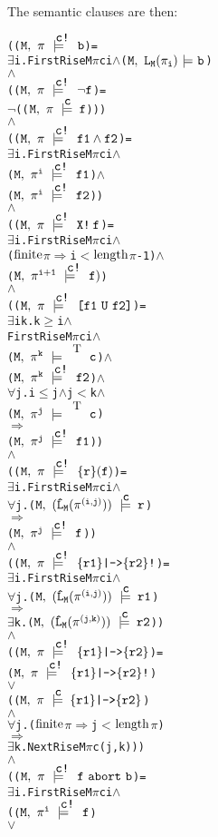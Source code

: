 \documentclass{llncs}
\newcommand{\And}{\(\wedge\)}
\newcommand{\Or}{\(\vee\)}
\newcommand{\Imp}{\(\Rightarrow\)}
\newcommand{\Not}{\(\neg\)}
\newcommand{\Forall}{\(\forall\)}
\newcommand{\Exists}{\(\exists\)}
\newcommand{\IsFinitePath}{\({\rm{finite}}\)}
\newcommand{\PathLength}{\({\rm{length}}\)}
\newcommand{\Leq}{\(\leq\)}
\newcommand{\Geq}{\(\geq\)}
\newcommand{\Le}{\(<\)}
\newcommand{\T}{\texttt{\small\rm{T}}}
\renewcommand{\Pi}{\(\pi\)}
\newcommand{\BSem}[3]{(\(\tt#1,~#2~{\models}~#3\))}
\newcommand{\SSem}[4]{(\(\tt{#1,~#2~\models^{\hspace*{-2.3mm}\raisebox{1mm}{\tt#3}}~#4}\))}
\newcommand{\FSem}[4]{(\(\tt{#1,~#2~\models^{\hspace*{-2.3mm}\raisebox{1mm}{\tt#3}}~#4}\))}
\newcommand{\FBool}[1]{#1}
\newcommand{\fNot}[1]{\neg#1}
\newcommand{\weakClock}[1]{#1}
\newcommand{\strongClock}[1]{#1!}
\newcommand{\restN}[2]{#1^{#2}}
\newcommand{\pathEl}[2]{#1_{#2}}
\newcommand{\pathSeg}[2]{#1^{#2}}
\newcommand{\lHat}[1]{\hat{\texttt{L}}_{#1}}
\newcommand{\lNoHat}[1]{{\texttt{L}}_{#1}}
\newcommand{\fAnd}[2]{#1 \wedge #2}
\newcommand{\fNext}[1]{\texttt{X!}\hspace*{0.8mm}#1}
\newcommand{\fUntil}[2]{\texttt{[}#1~\texttt{U}~#2\texttt{]}}
\newcommand{\fSuffixImp}[2]{\{#1\}(#2)}
\newcommand{\fStrongImp}[2]{\{#1\}\texttt{|->}\{#2\}\texttt{!}}
\newcommand{\fWeakImp}[2]{\{#1\}\texttt{|->}\{#2\}}
\newcommand{\fAbort}[2]{#1~\texttt{abort}~#2}
\begin{document}
The semantic clauses are then:

\begin{alltt}
    ({\FSem{M}{{\pi}}{{\strongClock{c}}}{\FBool{b}}} = 
      {\Exists}i. FirstRise M {\Pi} c i {\And} {\BSem{M}{\lNoHat{M}(\pathEl{{\pi}}{i})}{b}}
    {\And}
    ({\FSem{M}{{\pi}}{{\strongClock{c}}}{\fNot{f}}} = 
      {\Not}({\FSem{M}{{\pi}}{{\weakClock{c}}}{f}})) 
    {\And}
    ({\FSem{M}{{\pi}}{{\strongClock{c}}}{\fAnd{f1}{f2}}} = 
      {\Exists}i. FirstRise M {\Pi} c i {\And} 
          {\FSem{M}{\restN{{\pi}}{i}}{{\strongClock{c}}}{f1}}    {\And}
          {\FSem{M}{\restN{{\pi}}{i}}{{\strongClock{c}}}{f2}})
    {\And}
    ({\FSem{M}{{\pi}}{{\strongClock{c}}}{\fNext{f}}} = 
      {\Exists}i. FirstRise M {\Pi} c i            {\And} 
          ({\IsFinitePath} {\Pi} {\Imp} i {\Le} \PathLength {\Pi} - 1) {\And}
          {\FSem{M}{\restN{{\pi}}{i+1}}{{\strongClock{c}}}{f)}}
    {\And}
    ({\FSem{M}{{\pi}}{{\strongClock{c}}}{\fUntil{f1}{f2}}} = 
      {\Exists}i k. k {\Geq} i             {\And}
            FirstRise M {\Pi} c i  {\And}
            {\FSem{M}{\restN{{\pi}}{k}}{\weakClock{\T}}{{\FBool{c}}}}      {\And}  
            {\FSem{M}{\restN{{\pi}}{k}}{{\strongClock{c}}}{f2}}     {\And}
            {\Forall}j. i {\Leq} j {\And} j {\Le} k {\And} 
              {\FSem{M}{\restN{{\pi}}{j}}{\weakClock{\T}}{{\FBool{c}}}} 
              {\Imp}
              {\FSem{M}{\restN{{\pi}}{j}}{{\strongClock{c}}}{f1}})
    {\And}
    ({\FSem{M}{{\pi}}{{\strongClock{c}}}{\fSuffixImp{r}{f}}} = 
      {\Exists}i. FirstRise M {\Pi} c i {\And} 
          {\Forall}j. \SSem{M}{(\lHat{M} (\pathSeg{\pi}{(i,j)}))}{c}{r}
              {\Imp}
              {\FSem{M}{\restN{{\pi}}{j}}{{\strongClock{c}}}{f}})
    {\And}
    ({\FSem{M}{{\pi}}{{\strongClock{c}}}{\fStrongImp{r1}{r2}}} = 
      {\Exists}i. FirstRise M {\Pi} c i {\And} 
          {\Forall}j. \SSem{M}{(\lHat{M} (\pathSeg{\pi}{(i,j)}))}{c}{r1}
              {\Imp}
              {\Exists}k. \SSem{M}{(\lHat{M} (\pathSeg{\pi}{(j,k)}))}{c}{r2})
    {\And}
    ({\FSem{M}{{\pi}}{{\strongClock{c}}}{\fWeakImp{r1}{r2}}} = 
     {\FSem{M}{{\pi}}{{\strongClock{c}}}{\fStrongImp{r1}{r2}}}
      {\Or}
     ({\FSem{M}{{\pi}}{{\weakClock{c}}}{\fWeakImp{r1}{r2}}}
      {\And}
      {\Forall}j. ({\IsFinitePath} {\Pi} {\Imp} j {\Le} \PathLength {\Pi})
          {\Imp}
          {\Exists}k. NextRise M {\Pi} c (j,k)))
    {\And}
    ({\FSem{M}{{\pi}}{{\strongClock{c}}}{\fAbort{f}{b}}} =
      {\Exists}i. FirstRise M {\Pi} c i {\And}
          ({\FSem{M}{\restN{{\pi}}{i}}{{\strongClock{c}}}{f }}
           {\Or}

\end{alltt}
\end{document}
